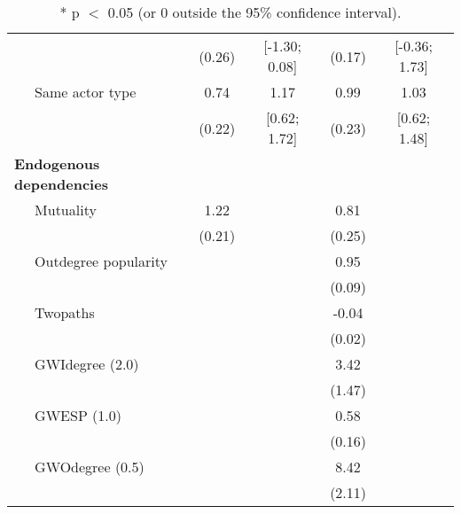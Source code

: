 \begin{table}[ht]
\begin{tabular}{lcccc}
   & (0.26) & [-1.30; 0.08] & (0.17) & [-0.36; 1.73] \\ 
  $\;\;\;\;$ Same actor type & 0.74 & 1.17 & 0.99 & 1.03 \\ 
   & (0.22) & [0.62; 1.72] & (0.23) & [0.62; 1.48] \\ 
  \textbf{Endogenous dependencies} &  &  &  &  \\ 
  $\;\;\;\;$ Mutuality & 1.22 &  & 0.81 &  \\ 
   & (0.21) &  & (0.25) &  \\ 
  $\;\;\;\;$ Outdegree popularity &  &  & 0.95 &  \\ 
   &  &  & (0.09) &  \\ 
  $\;\;\;\;$ Twopaths &  &  & -0.04 &  \\ 
   &  &  & (0.02) &  \\ 
  $\;\;\;\;$ GWIdegree (2.0) &  &  & 3.42 &  \\ 
   &  &  & (1.47) &  \\ 
  $\;\;\;\;$ GWESP (1.0) &  &  & 0.58 &  \\ 
   &  &  & (0.16) &  \\ 
  $\;\;\;\;$ GWOdegree (0.5) &  &  & 8.42 &  \\ 
   &  &  & (2.11) &  \\ 
   \hline
\hline
\end{tabular}
\endgroup
\caption{* p $<$ 0.05 (or 0 outside the 95\% confidence interval).} 
\label{tab:regTable}
\end{table}

